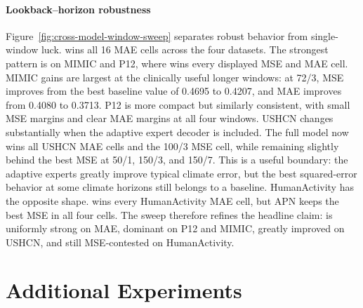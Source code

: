 \documentclass[preprint,12pt]{elsarticle}
\begin{document}
\paragraph{Lookback--horizon robustness}
Figure~\ref{fig:cross-model-window-sweep} separates robust behavior from
single-window luck. \method{} wins all 16 MAE cells across the four datasets.
The strongest pattern is on MIMIC and P12, where \method{} wins every displayed
MSE and MAE cell. MIMIC gains are largest at the clinically useful longer
windows: at 72/3, MSE improves from the best baseline value of 0.4695 to 0.4207,
and MAE improves from 0.4080 to 0.3713. P12 is more compact but similarly
consistent, with small MSE margins and clear MAE margins at all four windows. USHCN changes substantially when the adaptive expert decoder is included. The full
\method{} model now wins all USHCN MAE cells and the 100/3 MSE cell, while
remaining slightly behind the best MSE at 50/1, 150/3, and 150/7. This is a
useful boundary: the adaptive experts greatly improve typical climate error,
but the best squared-error behavior at some climate horizons still belongs to a
baseline. HumanActivity has the opposite shape. \method{} wins every
HumanActivity MAE cell, but APN keeps the best MSE in all four cells. The sweep
therefore refines the headline claim: \method{} is uniformly strong on MAE,
dominant on P12 and MIMIC, greatly improved on USHCN, and still MSE-contested on
HumanActivity.

\section{Additional Experiments}
\label{sec:additional-experiments}
\end{document}
